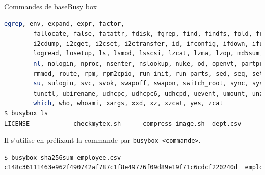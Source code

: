 \documentclass{beamer}
\begin{document}
    \begin{frame}[fragile]{Commandes de base}{Busy box}
        \begin{lstlisting}[language=bash,basicstyle=\tiny\ttfamily]
        egrep, env, expand, expr, factor,
        fallocate, false, fatattr, fdisk, fgrep, find, findfs, fold, free, freeramdisk, fsfreeze, fstrim, ftpget, ftpput, getopt, getty, grep, groups, gunzip, gzip, halt, head, hexdump, hostid, hostname, httpd, hwclock, i2cdetect,
        i2cdump, i2cget, i2cset, i2ctransfer, id, ifconfig, ifdown, ifup, init, insmod, ionice, ip, ipcalc, kill, killall, klogd, last, less, link, linux32, linux64, linuxrc, ln, loadfont, loadkmap, logger, login, logname,
        logread, losetup, ls, lsmod, lsscsi, lzcat, lzma, lzop, md5sum, mdev, microcom, mim, mkdir, mkdosfs, mke2fs, mkfifo, mknod, mkpasswd, mkswap, mktemp, modinfo, modprobe, more, mount, mt, mv, nameif, nbd-client, nc, netstat,
        nl, nologin, nproc, nsenter, nslookup, nuke, od, openvt, partprobe, passwd, paste, patch, pidof, ping, ping6, pivot_root, poweroff, printf, ps, pwd, rdate, readlink, realpath, reboot, renice, reset, resume, rev, rm, rmdir,
        rmmod, route, rpm, rpm2cpio, run-init, run-parts, sed, seq, setkeycodes, setpriv, setsid, sh, sha1sum, sha256sum, sha3sum, sha512sum, shred, shuf, sleep, sort, ssl_client, start-stop-daemon, stat, static-sh, strings, stty,
        su, sulogin, svc, svok, swapoff, swapon, switch_root, sync, sysctl, syslogd, tac, tail, tar, taskset, tc, tee, telnet, telnetd, test, tftp, time, timeout, top, touch, tr, traceroute, traceroute6, true, truncate, ts, tty,
        tunctl, ubirename, udhcpc, udhcpc6, udhcpd, uevent, umount, uname, uncompress, unexpand, uniq, unix2dos, unlink, unlzma, unshare, unxz, unzip, uptime, usleep, uudecode, uuencode, vconfig, vi, w, watch, watchdog, wc, wget,
        which, who, whoami, xargs, xxd, xz, xzcat, yes, zcat
$ busybox ls
LICENSE            checkmytex.sh      compress-image.sh  dept.csv           employee.csv       sqlite-hr.sh       venv
        \end{lstlisting}
        Il s'utilise en préfixant la commande par \lstinline{busybox <commande>}.
        \begin{lstlisting}[language=bash,basicstyle=\tiny\ttfamily]
$ busybox sha256sum employee.csv
c148c36111463e962f490742af787c1f8e49776f09d89e19f71c6cdcf220240d  employee.csv
        \end{lstlisting}
    \end{frame}
\end{document}
